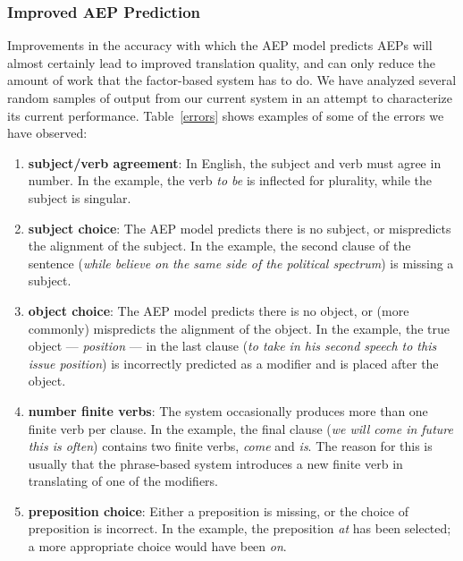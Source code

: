 \documentclass[10pt]{report}
\theoremstyle{plain}
\begin{document}
{\subsubsection{Improved AEP Prediction}
Improvements in the accuracy with which the AEP model predicts AEPs
will almost certainly lead to improved translation quality, and can
only reduce the amount of work that the factor-based system has to
do. We have analyzed several random samples of output from our current
system in an attempt to characterize its current
performance. Table~\ref{errors} shows examples of some of the errors
we have observed:

\begin{enumerate}
\item {\bf subject/verb agreement}: In English, the subject and verb
must agree in number. In the example, the verb {\em to be} is
inflected for plurality, while the subject is singular.
\item {\bf subject choice}: The AEP model predicts there is no
subject, or mispredicts the alignment of the subject. In the example,
the second clause of the sentence ({\em while believe on the same side
of the political spectrum}) is missing a subject.
\item {\bf object choice}: The AEP model predicts there is no object,
or (more commonly) mispredicts the alignment of the object. In the
example, the true object --- {\em position} --- in the last clause
({\em to take in his second speech to this issue position}) is
incorrectly predicted as a modifier and is placed after the object.
\item {\bf number finite verbs}: The system occasionally produces more
than one finite verb per clause. In the example, the final clause
({\em we will come in future this is often}) contains two finite
verbs, {\em come} and {\em is}. The reason for this is usually that
the phrase-based system introduces a new finite verb in translating of
one of the modifiers.
\item {\bf preposition choice}: Either a preposition is missing, or
the choice of preposition is incorrect. In the example, the
preposition {\em at} has been selected; a more appropriate choice
would have been {\em on}.
\end{enumerate}

}
\end{document}
